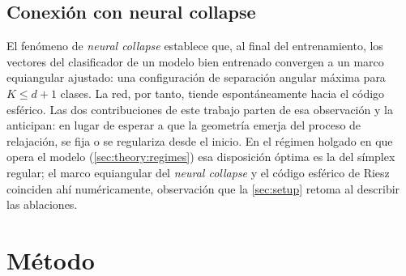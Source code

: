 \documentclass[11pt,a4paper]{article}
\theoremstyle{plain}
\begin{document}
\subsection{Conexión con neural collapse}
\label{sec:theory:nc}

El fenómeno de \emph{neural collapse} \cite{papyan2020} establece que,
al final del entrenamiento, los vectores del clasificador de un modelo
bien entrenado convergen a un marco equiangular ajustado: una
configuración de separación angular máxima para $K\le d+1$ clases. La
red, por tanto, tiende espontáneamente hacia el código esférico. Las dos
contribuciones de este trabajo parten de esa observación y la
anticipan: en lugar de esperar a que la geometría emerja del proceso de
relajación, se fija o se regulariza desde el inicio. En el régimen
holgado en que opera el modelo (\cref{sec:theory:regimes}) esa
disposición óptima es la del símplex regular; el marco equiangular del
\emph{neural collapse} y el código esférico de Riesz coinciden ahí
numéricamente, observación que la \cref{sec:setup} retoma al describir
las ablaciones.

\section{Método}
\label{sec:method}
\end{document}
